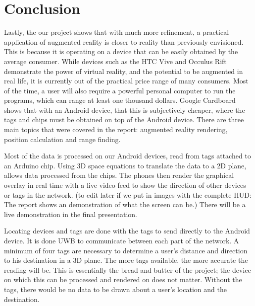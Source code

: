
\chapter{Conclusion} %

\label{Conclusion} %


Lastly, the our project shows that with much more refinement, a practical application of augmented reality is closer to reality than previously envisioned. This is because it is operating on a device that can be easily obtained by the average consumer. While devices such as the HTC Vive and Occulus Rift demonstrate the power of virtual reality, and the potential to be augmented in real life, it is currently out of the practical price range of many consumers. Most of the time, a user will also require a powerful personal computer to run the programs, which can range at least one thousand dollars. Google Cardboard shows that with an Android device, that this is subjectively cheaper, where the tags and chips must be obtained on top of the Android device. There are three main topics that were covered in the report: augmented reality rendering, position calculation and range finding.

Most of the data is processed on our Android devices, read from tags attached to an Arduino chip. Using 3D space equations to translate the data to a 2D plane, allows data processed from the chips. The phones then render the graphical overlay in real time with a live video feed to show the direction of other devices or tags in the network. (to edit later if we put in images with the complete HUD: The report shows an demonstration of what the screen can be.) There will be a live demonstration in the final presentation.

Locating devices and tags are done with the tags to send directly to the Android device. It is done UWB to communicate between each part of the network. A minimum of four tags are necessary to determine a user’s distance and direction to his destination in a 3D plane. The more tags available, the more accurate the reading will be. This is essentially the bread and butter of the project; the device on which this can be processed and rendered on does not matter. Without the tags, there would be no data to be drawn about a user’s location and the destination.

